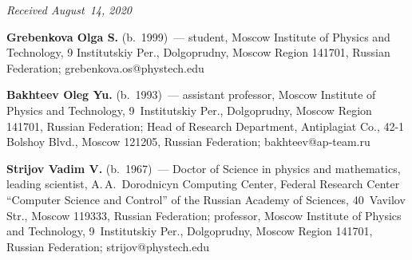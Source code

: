 \vspace*{-3pt}

  \hfill{\small\textit{Received August~14, 2020}}



 
\Contr

\noindent
\textbf{Grebenkova Olga S.} (b.\ 1999)~--- student, Moscow Institute of Physics 
and Technology, 9 Institutskiy Per., Dolgoprudny, Moscow Region 141701, 
Russian Federation; \mbox{grebenkova.os@phystech.edu}

\vspace*{3pt}

\noindent
\textbf{Bakhteev Oleg Yu.} (b.\ 1993)~--- assistant professor, Moscow 
Institute of Physics and Technology, 9~Institutskiy Per., Dolgoprudny, 
Moscow Region 141701, Russian Federation; Head of Research Department, 
Antiplagiat Co., 42-1 Bolshoy Blvd., Moscow 121205, Russian Federation;
\mbox{bakhteev@ap-team.ru}


\vspace*{3pt}

\noindent
\textbf{Strijov Vadim V.} (b.\ 1967)~--- Doctor of Science in physics and mathematics, 
leading scientist, A.\,A.~Dorodnicyn Computing Center, Federal Research Center
``Computer Science and Control'' of the Russian Academy of Sciences, 
 40~Vavilov Str., Moscow 119333, Russian Federation; professor, 
 Moscow Institute of Physics and Technology, 9~Institutskiy Per., 
 Dolgoprudny, Moscow Region 141701, Russian Federation; 
 \mbox{strijov@phystech.edu}


\label{end\stat}

\renewcommand{\bibname}{\protect\rm Литература}